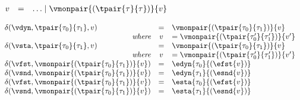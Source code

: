 {\flushleft
$\begin{array}{l c l}
  v & = & \ldots \mid \vmonpair{(\tpair{\tau}{\tau})}{v}
\end{array}$

\medskip
{}
$\begin{array}{l c l}
  \delta(\vdyn, \tpair{\tau_0}{\tau_1}, v) & = & \vmonpair{(\tpair{\tau_0}{\tau_1})}{v}
\\\hfill\emph{where} & v & = \vmonpair{(\tpair{\tau_0'}{\tau_1'})}{v'}
\\
  \delta(\vsta, \tpair{\tau_0}{\tau_1}, v) & = & \vmonpair{(\tpair{\tau_0}{\tau_1})}{v}
\\\hfill\emph{where} & v & = \vmonpair{(\tpair{\tau_0'}{\tau_1'})}{v'}
\\
  \delta(\vfst, \vmonpair{(\tpair{\tau_0}{\tau_1})}{v}) & = & \edyn{\tau_0}{(\efst{v})}
\\
  \delta(\vsnd, \vmonpair{(\tpair{\tau_0}{\tau_1})}{v}) & = & \edyn{\tau_1}{(\esnd{v})}
\\
  \delta(\vfst, \vmonpair{(\tpair{\tau_0}{\tau_1})}{v}) & = & \esta{\tau_0}{(\efst{v})}
\\
  \delta(\vsnd, \vmonpair{(\tpair{\tau_0}{\tau_1})}{v}) & = & \esta{\tau_1}{(\esnd{v})}
\end{array}$

\medskip
\begin{minipage}{0.5\columnwidth}
\begin{mathpar}
\end{mathpar}
\end{minipage}%
\begin{minipage}{0.5\columnwidth}
\begin{mathpar}
\end{mathpar}
\end{minipage}

}
